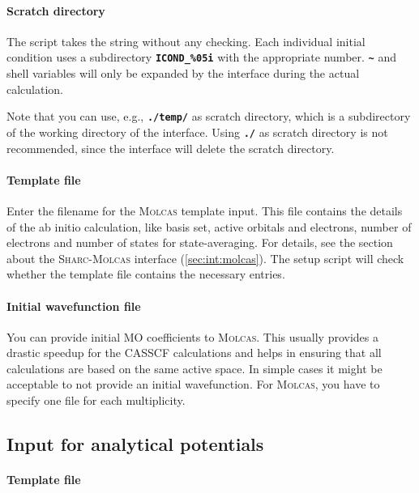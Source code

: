 \documentclass[a4paper,11pt,DIV=15,openany,twoside=false]{scrbook}
\newcommand{\sharc}{\textsc{Sharc}}
\newcommand{\ttt}[1]{\textbf{\texttt{#1}}}
\begin{document}
\paragraph{Scratch directory}

The script takes the string without any checking. Each individual initial condition uses a subdirectory \ttt{ICOND\_\%05i} with the appropriate number. \ttt{\textasciitilde} and shell variables will only be expanded by the interface during the actual calculation.

Note that you can use, e.g., \ttt{./temp/} as scratch directory, which is a subdirectory of the working directory of the interface. Using \ttt{./} as scratch directory is not recommended, since the interface will delete the scratch directory.

\paragraph{Template file}

Enter the filename for the \textsc{Molcas} template input. This file contains the details of the ab initio calculation, like basis set, active orbitals and electrons, number of electrons and number of states for state-averaging. For details, see the section about the \sharc-\textsc{Molcas} interface (\ref{sec:int:molcas}). The setup script will check whether the template file contains the necessary entries. 

\paragraph{Initial wavefunction file}

You can provide initial MO coefficients to \textsc{Molcas}. This usually provides a drastic speedup for the CASSCF calculations and helps in ensuring that all calculations are based on the same active space. In simple cases it might be acceptable to not provide an initial wavefunction. For \textsc{Molcas}, you have to specify one file for each multiplicity.



\subsection{Input for analytical potentials}\label{sec:setup_init.py:analytical}

\paragraph{Template file}
\end{document}
